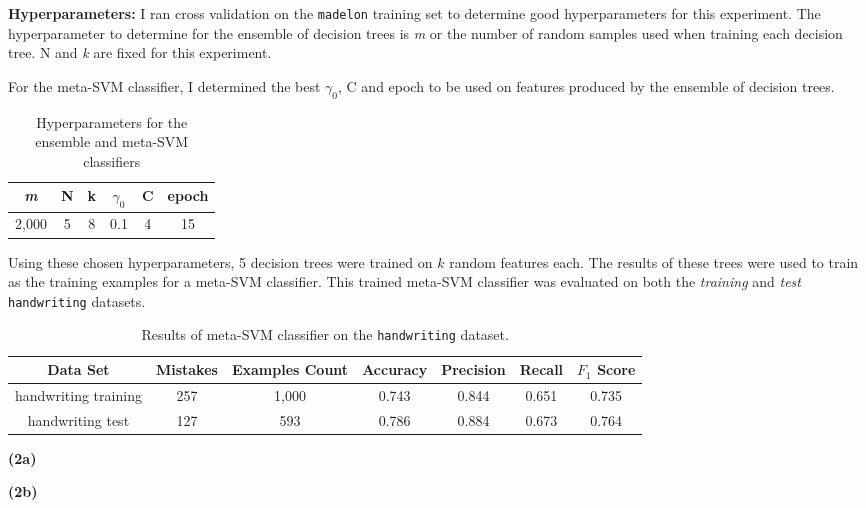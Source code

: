\documentclass[11pt]{article}
\renewcommand\part[1]{\vspace{.10in}\textbf{(#1)}}
\begin{document}
	\textbf{Hyperparameters:} I ran cross validation on the {\tt madelon} training set to determine good hyperparameters for this experiment. The hyperparameter to determine for the ensemble of decision trees is \textit{m} or the number of random samples used when training each decision tree. N and \textit{k} are fixed for this experiment.
	
	For the meta-SVM classifier, I determined the best $\gamma_0$, C and epoch to be used on features produced by the ensemble of decision trees.
	
\begin{table}[H]
\centering
{\renewcommand{\arraystretch}{1.2}%
\begin{tabular}{| c | c | c | c | c | c |}
\hline
\textit{m} & N & k & $\gamma_0$ & C & epoch\\
\hline
2,000 & 5 & 8 & 0.1 & 4 & 15\\ \hline
\end{tabular}}
\caption{Hyperparameters for the ensemble and meta-SVM classifiers}
\end{table}

Using these chosen hyperparameters, 5 decision trees were trained on $\textit{k}$ random features each. The results of these trees were used to train as the training examples for a meta-SVM classifier. This trained meta-SVM classifier was evaluated on both the \textit{training} and \textit{test} {\tt handwriting} datasets.

 \begin{table}[H]
\centering
{\renewcommand{\arraystretch}{1.2}%
\begin{tabular}{| c | c | c | c | c | c | c |}
\hline
Data Set & Mistakes & Examples Count & Accuracy & Precision & Recall & $F_1$ Score\\
\hline
handwriting training & 257 & 1,000 & 0.743 & 0.844 & 0.651 & 0.735\\ \hline
handwriting test & 127 & 593 & 0.786 & 0.884 & 0.673 & 0.764\\ \hline
\end{tabular}}
\caption{Results of meta-SVM classifier on the {\tt handwriting} dataset.}
\end{table}

\part{2a}

\part{2b}
\end{document}
